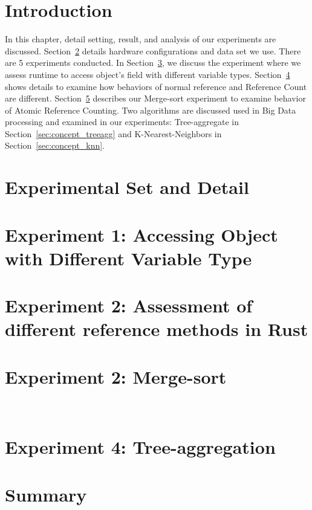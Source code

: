 \section{Introduction}
\label{sec:eval_intro}
In this chapter, detail setting, result, and analysis of our experiments are discussed.
Section~\ref{sec:eval_setdetail} details hardware configurations and data set we use. 
There are 5 experiments conducted. In Section~\ref{sec:eval_diffval}, we discuss the experiment 
where we assess runtime to access object's field with different variable types. 
Section~\ref{sec:eval_refcount} shows details to examine how behaviors of normal reference and Reference Count are different. 
Section~\ref{sec:eval_sort} describes our Merge-sort experiment to examine behavior of Atomic Reference Counting.
Two algorithms are discussed used in Big Data processing and examined in our experiments: 
Tree-aggregate in Section~\ref{sec:concept_treeagg} and K-Nearest-Neighbors in Section~\ref{sec:concept_knn}.

\section{Experimental Set and Detail}
\label{sec:eval_setdetail}


\section{Experiment 1: Accessing Object with Different Variable Type}
\label{sec:eval_diffval}


\section{Experiment 2: Assessment of different reference methods in Rust}
\label{sec:eval_refcount}


\section{Experiment 2: Merge-sort}
\label{sec:eval_sort}

\

\section{Experiment 4: Tree-aggregation}
\label{sec:eval_treeagg}


\section{Summary}
\label{sec:eval_summary}

% 